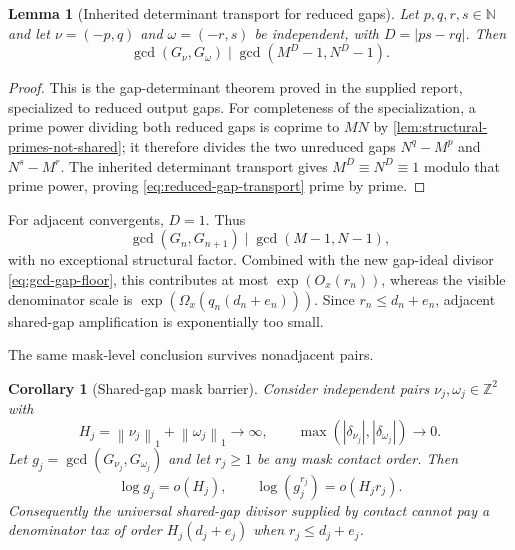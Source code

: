 \documentclass[11pt,oneside]{article}
\newtheorem{lemma}[theorem]{Lemma}
\newtheorem{corollary}[theorem]{Corollary}
\theoremstyle{definition}
\theoremstyle{remark}
\newcommand{\N}{\mathbb N}
\newcommand{\Z}{\mathbb Z}
\newcommand{\normone}[1]{\left\lVert #1\right\rVert_1}
\begin{document}
\begin{lemma}[Inherited determinant transport for reduced gaps]
\label{lem:reduced-gap-transport}
Let $p,q,r,s\in\N$ and let $\nu=(-p,q)$ and $\omega=(-r,s)$ be
independent, with $D=|ps-rq|$.  Then
\begin{equation}
 \gcd(G_\nu,G_\omega)
 \mid \gcd(M^D-1,N^D-1).
 \label{eq:reduced-gap-transport}
\end{equation}
\end{lemma}

\begin{proof}
This is the gap-determinant theorem proved in the supplied report, specialized to reduced
output gaps.  For completeness of the specialization, a prime power dividing both reduced
gaps is coprime to $MN$ by \cref{lem:structural-primes-not-shared}; it therefore divides the
two unreduced gaps $N^q-M^p$ and $N^s-M^r$.  The inherited determinant transport gives
$M^D\equiv N^D\equiv1$ modulo that prime power, proving
\eqref{eq:reduced-gap-transport} prime by prime.
\end{proof}

For adjacent convergents, $D=1$.  Thus
\begin{equation}
 \gcd(G_n,G_{n+1})\mid\gcd(M-1,N-1),
 \label{eq:adjacent-reduced-gap-fixed}
\end{equation}
with no exceptional structural factor.  Combined with the new gap-ideal divisor
\eqref{eq:gcd-gap-floor}, this contributes at most $\exp(O_x(r_n))$, whereas the visible
denominator scale is $\exp(\Omega_x(q_n(d_n+e_n)))$.  Since
$r_n\le d_n+e_n$, adjacent shared-gap amplification is exponentially too small.

The same mask-level conclusion survives nonadjacent pairs.

\begin{corollary}[Shared-gap mask barrier]
\label{cor:nonadjacent-gcd-barrier}
Consider independent pairs $\nu_j,\omega_j\in\Z^2$ with
\[
 H_j=\normone{\nu_j}+\normone{\omega_j}\longrightarrow\infty,
 \qquad
 \max(|\delta_{\nu_j}|,|\delta_{\omega_j}|)\longrightarrow0.
\]
Let $g_j=\gcd(G_{\nu_j},G_{\omega_j})$ and let $r_j\ge1$ be any mask contact order.  Then
\begin{equation}
 \log g_j=o(H_j),
 \qquad
 \log(g_j^{r_j})=o(H_jr_j).
 \label{eq:fresh-gcd-subheight}
\end{equation}
Consequently the universal shared-gap divisor supplied by contact cannot pay a denominator
tax of order $H_j(d_j+e_j)$ when $r_j\le d_j+e_j$.
\end{corollary}
\end{document}
